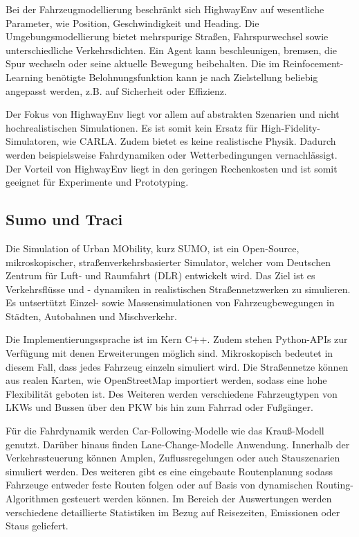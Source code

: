 Bei der Fahrzeugmodellierung beschränkt sich HighwayEnv auf wesentliche Parameter, wie Position, Geschwindigkeit und Heading. Die Umgebungsmodellierung bietet mehrspurige Straßen, Fahrspurwechsel sowie unterschiedliche Verkehrsdichten. Ein Agent kann beschleunigen, bremsen, die Spur wechseln oder seine aktuelle Bewegung beibehalten. Die im Reinfocement-Learning benötigte Belohnungsfunktion kann je nach Zielstellung beliebig angepasst werden, z.B. auf Sicherheit oder Effizienz. 

Der Fokus von HighwayEnv liegt vor allem auf abstrakten Szenarien und nicht hochrealistischen Simulationen. Es ist somit kein Ersatz für High-Fidelity-Simulatoren, wie CARLA. Zudem bietet es keine realistische Physik. Dadurch werden beispielsweise Fahrdynamiken oder Wetterbedingungen vernachlässigt. Der Vorteil von HighwayEnv liegt in den geringen Rechenkosten und ist somit geeignet für Experimente und Prototyping.
\subsection{Sumo und Traci}
Die Simulation of Urban MObility, kurz SUMO, ist ein Open-Source, mikroskopischer, straßenverkehrsbasierter Simulator, welcher vom Deutschen Zentrum für Luft- und Raumfahrt (DLR) entwickelt wird. Das Ziel ist es Verkehrsflüsse und - dynamiken in realistischen Straßennetzwerken zu simulieren. Es untsertützt Einzel- sowie Massensimulationen von Fahrzeugbewegungen in Städten, Autobahnen und Mischverkehr.

Die Implementierungssprache ist im Kern C++. Zudem stehen Python-APIs zur Verfügung mit denen Erweiterungen möglich sind. Mikroskopisch bedeutet in diesem Fall, dass jedes Fahrzeug einzeln simuliert wird. Die Straßennetze können aus realen Karten, wie OpenStreetMap importiert werden, sodass eine hohe Flexibilität geboten ist. Des Weiteren werden verschiedene Fahrzeugtypen von LKWs und Bussen über den PKW bis hin zum Fahrrad oder Fußgänger.

Für die Fahrdynamik werden Car-Following-Modelle wie das Krauß-Modell genutzt. Darüber hinaus finden Lane-Change-Modelle Anwendung. Innerhalb der Verkehrssteuerung können Amplen, Zuflussregelungen oder auch Stauszenarien simuliert werden. Des weiteren gibt es eine eingebaute Routenplanung sodass Fahrzeuge entweder feste Routen folgen oder auf Basis von dynamischen Routing-Algorithmen gesteuert werden können. Im Bereich der Auswertungen werden verschiedene detaillierte Statistiken im Bezug auf Reisezeiten, Emissionen oder Staus geliefert.

